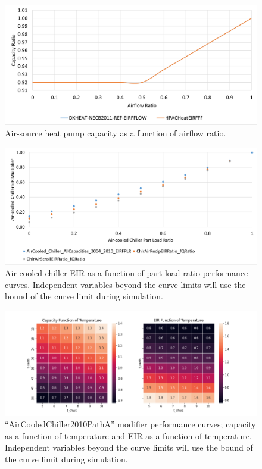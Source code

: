 \begin{figure}
    \centering \includegraphics[width=1.0\textwidth]{figures/ashp_capff.png}
    \caption[Air-source heat pump capacity as a function of airflow ratio]{Air-source heat pump capacity as a function of airflow ratio.}
    \label{fig:ashp_capff}
\end{figure}

\begin{figure}
    \centering \includegraphics[width=1.0\textwidth]{figures/ac_chiller_eir_curves.png}
    \caption[Air-cooled chiller EIR as a function of part load ratio performance curves]{Air-cooled chiller EIR as a function of part load ratio performance curves. Independent variables beyond the curve limits will use the bound of the curve limit during simulation.}
    \label{fig:acc_eir_curves}
\end{figure}

\begin{figure}
    \centering \includegraphics[width=1.0\textwidth]{figures/AirCooled_Chiller_2010_PathA_Modifiers.png}
    \caption["AirCooledChiller2010PathA" modifier performance curves]{``AirCooledChiller2010PathA'' modifier performance curves; capacity as a function of temperature and EIR as a function of temperature. Independent variables beyond the curve limits will use the bound of the curve limit during simulation.}
    \label{fig:AirCooledChiller2010PathA_funct_curves}
\end{figure}

